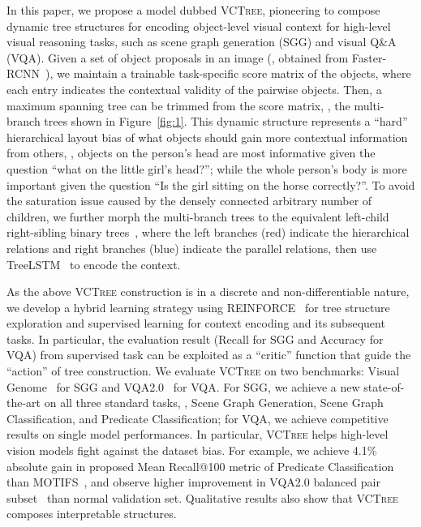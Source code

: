 \documentclass[10pt,twocolumn,letterpaper]{article}
\begin{document}
In this paper, we propose a model dubbed \textsc{VCTree}, pioneering to compose dynamic tree structures for encoding object-level visual context for high-level visual reasoning tasks, such as scene graph generation (SGG) and visual Q\&A (VQA). Given a set of object proposals in an image (\eg, obtained from Faster-RCNN~\cite{ren2015faster}), we maintain a trainable task-specific score matrix of the objects, where each entry indicates the contextual validity of the pairwise objects. Then, a maximum spanning tree can be trimmed from the score matrix, \eg, the multi-branch trees shown in Figure~\ref{fig:1}. This dynamic structure represents a ``hard'' hierarchical layout bias of what objects should gain more contextual information from others, \eg, objects on the person's head are most informative given the question ``what on the little girl's head?''; while the whole person's body is more important given the question ``Is the girl sitting on the horse correctly?''. To avoid the saturation issue caused by the densely connected arbitrary number of children, we further morph the multi-branch trees to the equivalent left-child right-sibling binary trees~\cite{Cormen2001}, where the left branches (red) indicate the hierarchical relations and right branches (blue) indicate the parallel relations, then use TreeLSTM~\cite{tai2015improved} to encode the context.

As the above \textsc{VCTree} construction is in a discrete and non-differentiable nature, we develop a hybrid learning strategy using REINFORCE~\cite{hu2017learning, Rennie_2017_CVPR, williams1992simple} for tree structure exploration and supervised learning for context encoding and its subsequent tasks. In particular, the evaluation result (Recall for SGG and Accuracy for VQA) from supervised task can be exploited as a “critic” function that guide the ``action'' of tree construction.  We evaluate \textsc{VCTree} on two benchmarks: Visual Genome~\cite{krishna2017visual} for SGG and VQA2.0~\cite{goyal2017making} for VQA. For SGG, we achieve a new state-of-the-art on all three standard tasks, \ie, Scene Graph Generation, Scene Graph Classification, and Predicate Classification; for VQA, we achieve competitive results on single model performances. In particular, \textsc{VCTree} helps high-level vision models fight against the dataset bias. For example, we achieve 4.1\% absolute gain in proposed Mean Recall@100 metric of Predicate Classification than MOTIFS~\cite{zellers2017neural}, and observe higher improvement in VQA2.0 balanced pair subset~\cite{Teney_2018_CVPR} than normal validation set. Qualitative results also show that \textsc{VCTree} composes interpretable structures. 
\end{document}
